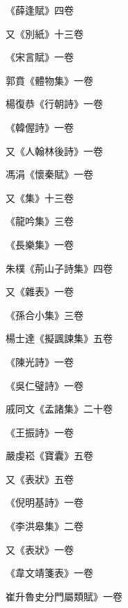 \begin{pinyinscope}
 《薛逢賦》四卷



 又《別紙》十三卷



 《宋言賦》一卷



 郭賁《體物集》一卷



 楊復恭《行朝詩》一卷



 《韓偓詩》一卷



 又《人翰林後詩》一卷



 馮涓《懷秦賦》一卷



 又《集》十三卷



 《龍吟集》三卷



 《長樂集》一卷



 朱樸《荊山子詩集》四卷



 又《雜表》一卷



 《孫合小集》三卷



 楊士達《擬諷諫集》五卷



 《陳光詩》一卷



 《吳仁璧詩》一卷



 戚同文《孟諸集》二十卷



 《王振詩》一卷



 嚴虔崧《寶囊》五卷



 又《表狀》五卷



 《倪明基詩》一卷



 《李洪皋集》二卷



 又《表狀》一卷



 《韋文靖箋表》一卷



 崔升魯史分門屬類賦》一卷




\end{pinyinscope}
